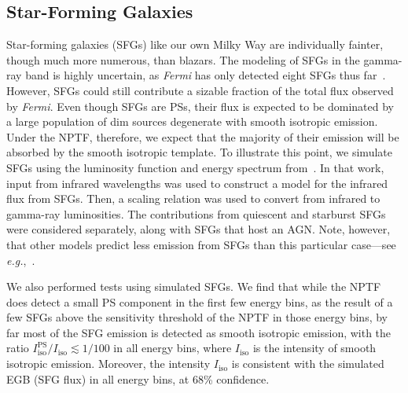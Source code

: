 \subsection{Star-Forming Galaxies}

Star-forming galaxies (SFGs) like our own Milky Way are individually fainter, though much more numerous, than blazars.  The modeling of SFGs in the gamma-ray band is highly uncertain, as \emph{Fermi} has only detected eight SFGs thus far~\cite{Fornasa:2015qua}.  However, SFGs could still contribute a sizable fraction of the total flux observed by \emph{Fermi}.  Even though SFGs are PSs, their flux is expected to be dominated by a large population of dim sources degenerate with smooth isotropic emission.  Under the NPTF, therefore, we expect that the majority of their  emission will be absorbed by the smooth isotropic template.  
To illustrate this point, we simulate SFGs using the luminosity function and energy spectrum from~\cite{Tamborra:2014xia}.  In that work, input from infrared wavelengths was used to construct a model for the infrared flux from SFGs.
Then, a scaling relation was used to convert from infrared to gamma-ray luminosities.  The contributions from quiescent and starburst SFGs were considered separately, along with SFGs that host an AGN.  Note, however, that other models predict less emission from SFGs than this particular case---see \emph{e.g.},~\cite{Makiya:2010zt,Inoue:2011bm,Ackermann:2012vca}.

We also performed tests using simulated SFGs. We find that while the NPTF does detect a small PS component in the first few energy bins, as the result of a few SFGs above the sensitivity threshold of the NPTF in those energy bins, by far most of the SFG emission is detected as smooth isotropic emission, with the ratio $I_\text{iso}^\text{PS} / I_\text{iso}\lesssim 1/100$ in all energy bins, where $I_\text{iso}$ is the intensity of smooth isotropic emission.  Moreover, the intensity $I_\text{iso}$ is consistent with the simulated EGB (SFG flux) in all energy bins, at 68\% confidence.

